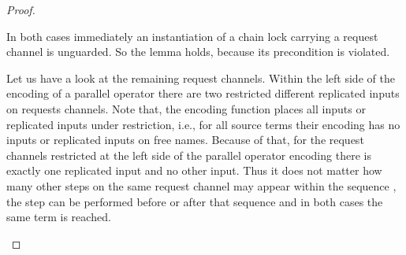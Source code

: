 \documentclass[]{llncs}
\begin{document}
\begin{proof}
\begin{description}
			In both cases immediately an instantiation of a chain lock carrying a request channel is unguarded. So the lemma holds, because its precondition is violated.
			
			Let us have a look at the remaining request channels. Within the left side of the encoding of a parallel operator there are two restricted different replicated inputs on requests channels. Note that, the encoding function places all inputs or replicated inputs under restriction, i.e., for all source terms their encoding has no inputs or replicated inputs on free names. Because of that, for the request channels restricted at the left side of the parallel operator encoding there is exactly one replicated input and no other input. Thus it does not matter how many other steps on the same request channel may appear within the sequence , the step  can be performed before or after that sequence and in both cases the same term  is reached.
			

\end{description}
\end{proof}
\end{document}
